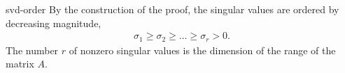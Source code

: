 \begin{Corollary}{svd-order}
  By the construction of the proof, the singular values are ordered by
  decreasing magnitude,
  \begin{gather}
    \label{eq:svd:2}
    \sigma_1 \ge \sigma_2 \ge \dots \ge \sigma_r > 0.
  \end{gather}
  The number $r$ of nonzero singular values is the dimension of the
  range of the matrix $A$.
\end{Corollary}

